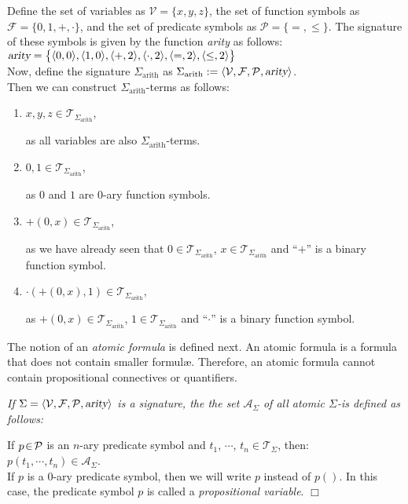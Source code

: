 \example
Define the set of variables as $\mathcal{V} = \{ x, y, z \}$, the set of function symbols as
 $\mathcal{F} = \{ 0, 1, \mathtt{+}, \cdot \}$, 
and the set of predicate symbols as $\mathcal{P} = \{\mathtt{=}, \leq\}$.  
The signature of these symbols is given by the function  \textsl{arity} 
as follows: \\[0.2cm]
\hspace*{1.3cm} 
$\textsl{arity} = \bigl\{ \pair(0,0), \pair(1,0), \pair(\mathtt{+},2),
 \pair(\cdot,2), \pair(=,2), \pair(\leq,2) \bigr\}
$
\\[0.2cm]
Now, define the signature $\Sigma_\mathrm{arith}$ as
$\Sigma_\mathrm{arith} := \langle \mathcal{V}, \mathcal{F}, \mathcal{P}, \textsl{arity} \rangle$. 
\\[0.2cm]%
Then we can construct  $\Sigma_{\mathrm{arith}}$-terms as follows:
\begin{enumerate}
\item $x, y, z \in \mathcal{T}_{\Sigma_{\mathrm{arith}}}$, 
      
      as all variables are also  $\Sigma_{\mathrm{arith}}$-terms.
\item $0, 1 \in \mathcal{T}_{\Sigma_{\mathrm{arith}}}$,  

      as $0$ and $1$ are  $0$-ary function symbols.
\item $\mathtt{+}(0,x) \in \mathcal{T}_{\Sigma_{\mathrm{arith}}}$, 

      as we have already seen that  $0 \in \mathcal{T}_{\Sigma_{\mathrm{arith}}}$, $x \in \mathcal{T}_{\Sigma_{\mathrm{arith}}}$ and
      ``$\mathtt{+}$'' is a binary function symbol.
\item $\cdot(\mathtt{+}(0,x),1) \in \mathcal{T}_{\Sigma_{\mathrm{arith}}}$, 

      as $\mathtt{+}(0,x) \in \mathcal{T}_{\Sigma_{\mathrm{arith}}}$, $1 \in \mathcal{T}_{\Sigma_{\mathrm{arith}}}$ and
      ``$\cdot$'' is a binary function symbol.
\end{enumerate}

The notion of an  \emph{atomic formula} is defined next.  
An atomic formula is a formula that does not contain smaller formul\ae.
Therefore, an atomic formula cannot contain propositional connectives or quantifiers.

\begin{Definition}
{\em
  If  $\Sigma = \langle \mathcal{V}, \mathcal{F}, \mathcal{P}, \textsl{arity} \rangle$ is a
  signature, the the set  $\mathcal{A}_\Sigma$ of all atomic $\Sigma$-\formulae is defined as
  follows:

   If $p \!\in\! \mathcal{P}$ is an $n$-ary predicate symbol and 
   $t_1$, $\cdots$, $t_n \in \mathcal{T}_\Sigma$, then: \\[0.2cm]
  \hspace*{1.3cm} $p(t_1,\cdots,t_n) \in \mathcal{A}_\Sigma$.  \\[0.2cm]
  If  $p$ is a  0-ary predicate symbol, then we will write  $p$ instead of  $p()$.
  In this case, the predicate symbol $p$ is called a  \emph{propositional variable}.
  \hspace*{\fill} $\Box$
}
\end{Definition}


